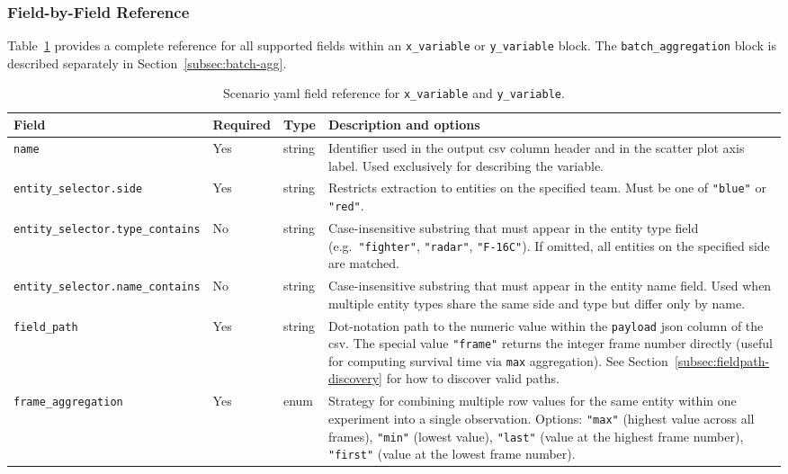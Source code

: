 \subsubsection{Field-by-Field Reference}
\label{subsec:yaml-fields}

Table~\ref{tab:yaml-fields} provides a complete reference for all supported fields within an
\texttt{x\_variable} or \texttt{y\_variable} block.  The \texttt{batch\_aggregation} block is
described separately in Section~\ref{subsec:batch-agg}.

\begin{table}[htbp]
\centering
\caption{Scenario \gls{yaml} field reference for \texttt{x\_variable} and \texttt{y\_variable}.}
\label{tab:yaml-fields}
\footnotesize
\begin{tabularx}{\linewidth}{l l l >{\raggedright\arraybackslash}X}
\toprule
Field & Required & Type & Description and options \\
\midrule
\texttt{name} & Yes & string & Identifier used in the output \gls{csv} column header and in the scatter plot axis label. Used exclusively for describing the variable. \\
\addlinespace
\texttt{entity\_selector.side} & Yes & string & Restricts extraction to entities on the specified team. Must be one of \texttt{"blue"} or \texttt{"red"}. \\
\addlinespace
\texttt{entity\_selector.type\_contains} & No & string & Case-insensitive substring that must appear in the entity type field (e.g.\ \texttt{"fighter"}, \texttt{"radar"}, \texttt{"F-16C"}). If omitted, all entities on the specified side are matched. \\
\addlinespace
\texttt{entity\_selector.name\_contains} & No & string & Case-insensitive substring that must appear in the entity name field. Used when multiple entity types share the same side and type but differ only by name. \\
\addlinespace
\texttt{field\_path} & Yes & string & Dot-notation path to the numeric value within the \texttt{payload} \gls{json} column of the \gls{csv}. The special value \texttt{"frame"} returns the integer frame number directly (useful for computing survival time via \texttt{max} aggregation). See Section~\ref{subsec:fieldpath-discovery} for how to discover valid paths. \\
\addlinespace
\texttt{frame\_aggregation} & Yes & enum & Strategy for combining multiple row values for the same entity within one experiment into a single observation. Options: \texttt{"max"} (highest value across all frames), \texttt{"min"} (lowest value), \texttt{"last"} (value at the highest frame number), \texttt{"first"} (value at the lowest frame number). \\

\end{tabularx}
\end{table}

